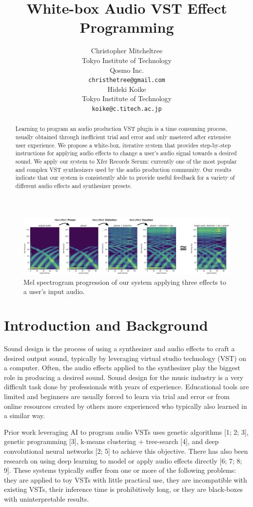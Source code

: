 \documentclass{article}
\title{White-box Audio VST Effect Programming}
\author{%
  Christopher Mitcheltree \\
  Tokyo Institute of Technology \\
  Qosmo Inc. \\
  \texttt{christhetree@gmail.com} \\
   \And
   Hideki Koike \\
   Tokyo Institute of Technology \\
   \texttt{koike@c.titech.ac.jp} \\
}
\begin{document}
\maketitle

\begin{abstract}
  Learning to program an audio production VST plugin is a time consuming process, usually obtained through inefficient trial and error and only mastered after extensive user experience. We propose a white-box, iterative system that provides step-by-step instructions for applying audio effects to change a user's audio signal towards a desired sound. We apply our system to Xfer Records Serum: currently one of the most popular and complex VST synthesizers used by the audio production community. Our results indicate that our system is consistently able to provide useful feedback for a variety of different audio effects and synthesizer presets.
\end{abstract}

\begin{figure}[h]
  \centering
  \includegraphics[width=1.0\linewidth]{images/fig_1}
  \caption{Mel spectrogram progression of our system applying three effects to a user's input audio.}
\end{figure}

\section{Introduction and Background}

Sound design is the process of using a synthesizer and audio effects to craft a desired output sound, typically by leveraging virtual studio technology (VST) on a computer. Often, the audio effects applied to the synthesizer play the biggest role in producing a desired sound. Sound design for the music industry is a very difficult task done by professionals with years of experience. Educational tools are limited and beginners are usually forced to learn via trial and error or from online resources created by others more experienced who typically also learned in a similar way.

Prior work leveraging AI to program audio VSTs uses genetic algorithms [1; 2; 3], genetic programming [3], k-means clustering + tree-search [4], and deep convolutional neural networks [2; 5] to achieve this objective. There has also been research on using deep learning to model or apply audio effects directly [6; 7; 8; 9]. These systems typically suffer from one or more of the following problems: they are applied to toy VSTs with little practical use, they are incompatible with existing VSTs, their inference time is prohibitively long, or they are black-boxes with uninterpretable results.
\end{document}
